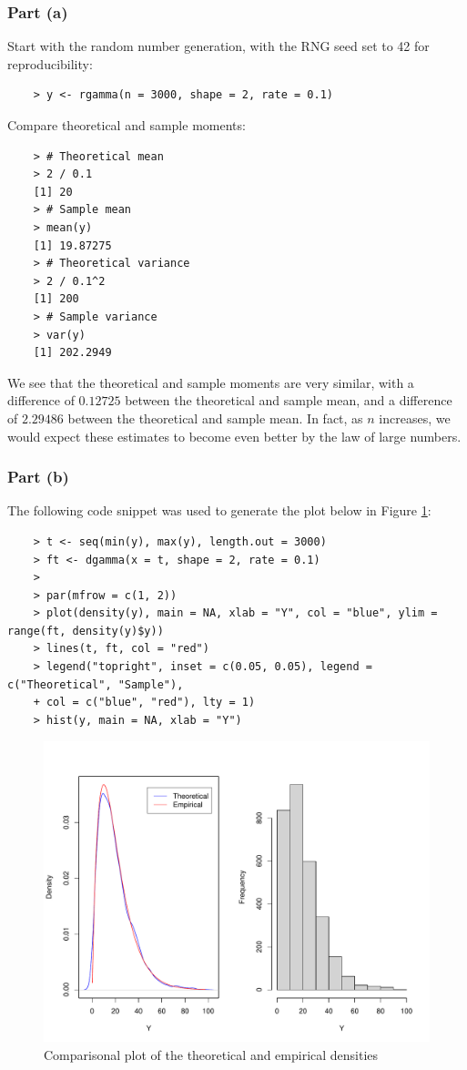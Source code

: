 \documentclass{report}
\begin{document}
\subsubsection*{Part (a)}
Start with the random number generation, with the RNG seed set to 42 for reproducibility:
\begin{verbatim}
    > y <- rgamma(n = 3000, shape = 2, rate = 0.1)
\end{verbatim}
Compare theoretical and sample moments:
\begin{verbatim}
    > # Theoretical mean
    > 2 / 0.1
    [1] 20
    > # Sample mean
    > mean(y)
    [1] 19.87275
    > # Theoretical variance
    > 2 / 0.1^2
    [1] 200
    > # Sample variance
    > var(y)
    [1] 202.2949
\end{verbatim}
We see that the theoretical and sample moments are very similar, with a difference of $0.12725$
between the theoretical and sample mean, and a difference of $2.29486$ between the theoretical and sample mean. In fact, as $n$ increases, we would expect these estimates to become even better by the law of large numbers.

\subsubsection*{Part (b)}
The following code snippet was used to generate the plot below in Figure \ref{fig:plot_theoretical_empirical}:
\begin{verbatim}
    > t <- seq(min(y), max(y), length.out = 3000)
    > ft <- dgamma(x = t, shape = 2, rate = 0.1)
    > 
    > par(mfrow = c(1, 2))
    > plot(density(y), main = NA, xlab = "Y", col = "blue", ylim = range(ft, density(y)$y))
    > lines(t, ft, col = "red")
    > legend("topright", inset = c(0.05, 0.05), legend = c("Theoretical", "Sample"), 
    + col = c("blue", "red"), lty = 1)
    > hist(y, main = NA, xlab = "Y")
\end{verbatim}

\begin{figure}[H]
    \centering
    \includegraphics[width=\textwidth]{plot_theoretical_empirical.pdf}
    \caption{Comparisonal plot of the theoretical and empirical densities}
    \label{fig:plot_theoretical_empirical}
\end{figure}
\end{document}
